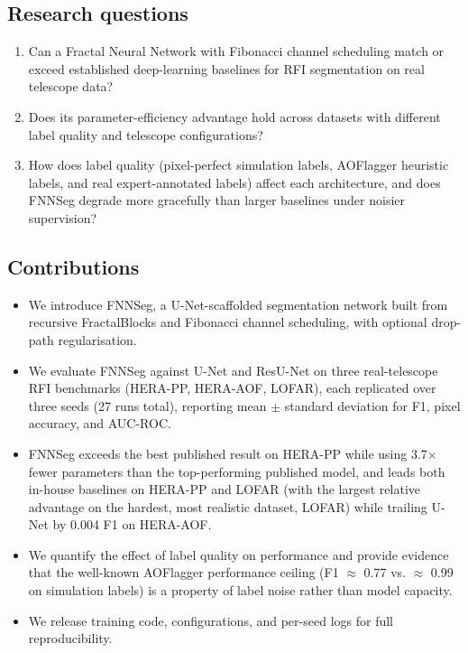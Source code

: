 \documentclass[11pt]{article}
\begin{document}
\subsection{Research questions}
\begin{enumerate}
\item Can a Fractal Neural Network with Fibonacci channel scheduling match or exceed established deep-learning baselines for RFI segmentation on real telescope data?
\item Does its parameter-efficiency advantage hold across datasets with different label quality and telescope configurations?
\item How does label quality (pixel-perfect simulation labels, AOFlagger heuristic labels, and real expert-annotated labels) affect each architecture, and does FNNSeg degrade more gracefully than larger baselines under noisier supervision?
\end{enumerate}

\subsection{Contributions}
\begin{itemize}
\item We introduce FNNSeg, a U-Net-scaffolded segmentation network built from recursive FractalBlocks and Fibonacci channel scheduling, with optional drop-path regularisation.
\item We evaluate FNNSeg against U-Net and ResU-Net on three real-telescope RFI benchmarks (HERA-PP, HERA-AOF, LOFAR), each replicated over three seeds (27 runs total), reporting mean $\pm$ standard deviation for F1, pixel accuracy, and AUC-ROC.
\item FNNSeg exceeds the best published result on HERA-PP \citep{dutoit2023} while using 3.7$\times$ fewer parameters than the top-performing published model, and leads both in-house baselines on HERA-PP and LOFAR (with the largest relative advantage on the hardest, most realistic dataset, LOFAR) while trailing U-Net by 0.004 F1 on HERA-AOF.
\item We quantify the effect of label quality on performance and provide evidence that the well-known AOFlagger performance ceiling (F1 $\approx$ 0.77 vs. $\approx$ 0.99 on simulation labels) is a property of label noise rather than model capacity.
\item We release training code, configurations, and per-seed logs for full reproducibility.
\end{itemize}
\end{document}
